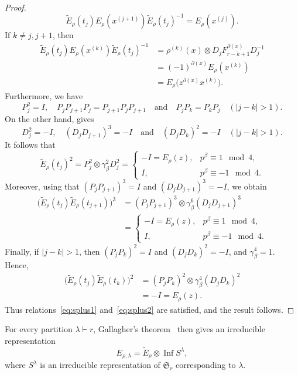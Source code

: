 \documentclass[reqno]{amsart}
\DeclareMathOperator{\Inf}{Inf}
\newcommand{\sym}{\mathfrak{S}}
\theoremstyle{definition}
\begin{document}
\begin{proof}
\[\widetilde{E}_\rho(t_j)E_\rho(x^{(j+1)})\widetilde{E}_\rho(t_j)^{-1}
=
E_\rho(x^{(j)}).
\]
If $k\neq j,j+1$, then
\[
\begin{aligned}
\widetilde{E}_\rho(t_j)E_\rho(x^{(k)})\widetilde{E}_\rho(t_j)^{-1}
&=
\rho^{(k)}(x)\otimes
D_jF_{r-k+1}^{\partial(x)}D_j^{-1}\\
&=
(-1)^{\partial(x)}E_\rho(x^{(k)})\\
&=
E_\rho\bigl(z^{\partial(x)}x^{(k)}\bigr).
\end{aligned}
\]
Furthermore, we have
\begin{equation}
\label{eq:relationfliptresse}
P_j^2=I,\quad
P_jP_{j+1}P_j=P_{j+1}P_jP_{j+1}
\quad\text{and}\quad
P_jP_k=P_kP_j\quad(|j-k|>1).
\end{equation}
On the other hand, \cite[Lemma~4.2(1), (3), (6)]{MichlerOlsson} gives
\[
D_j^2=-I,\quad
(D_jD_{j+1})^3=-I
\quad\text{and}\quad
(D_jD_k)^2=-I\quad(|j-k|>1).
\]
It follows that
\[
\widetilde E_\rho(t_j)^2
=
P_j^2\otimes \gamma_\beta^2D_j^2
=
\begin{cases}
-I=E_\rho(z),&p^\beta\equiv1\mod4,\\
 I,&p^\beta\equiv-1\mod4.
\end{cases}
\]
Moreover, using that $ (P_jP_{j+1})^3=I$ and $(D_jD_{j+1})^3=-I $, we
obtain
\[
\begin{aligned}
\bigl(
\widetilde E_\rho(t_j)
\widetilde E_\rho(t_{j+1})
\bigr)^3
&=
(P_jP_{j+1})^3
\otimes
\gamma_\beta^6(D_jD_{j+1})^3\\
&=
\begin{cases}
-I=E_\rho(z),&p^\beta\equiv1\mod4,\\
 I,&p^\beta\equiv-1\mod4.
\end{cases}
\end{aligned}
\]
Finally, if $|j-k|>1$, then
$
(P_jP_k)^2=I$ and
$(D_jD_k)^2=-I$,
and $\gamma_\beta^4=1$. Hence,
\[
\begin{aligned}
\bigl(
\widetilde E_\rho(t_j)
\widetilde E_\rho(t_k)
\bigr)^2
&=
(P_jP_k)^2
\otimes
\gamma_\beta^4(D_jD_k)^2\\
&=
-I
=
E_\rho(z).
\end{aligned}
\]
Thus relations~\eqref{eq:splus1} and~\eqref{eq:splus2} are satisfied,
and the result follows.
\end{proof}

For every partition $\lambda\vdash r$, Gallagher's
theorem~\cite[Corollary~(6.17)]{isaacs} then gives an irreducible
representation
\begin{equation}
\label{eq:basensahom}
E_{\rho,\lambda}
=
\widetilde{E}_\rho\otimes\Inf S^\lambda,
\end{equation}
where $S^\lambda$ is an irreducible representation of $\sym_r$
corresponding to $\lambda$.
\end{document}
